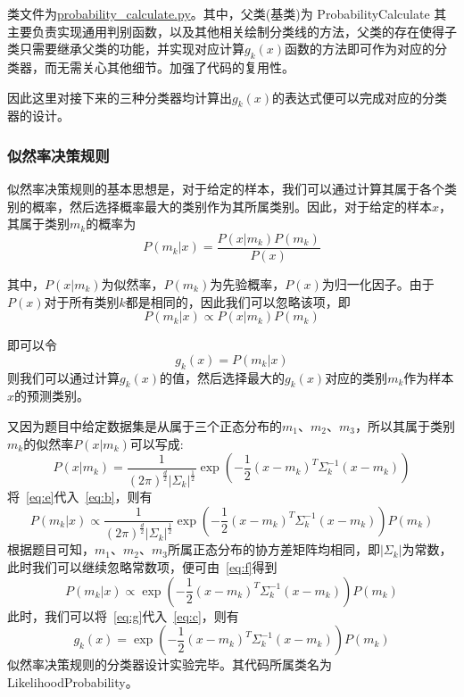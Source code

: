 \documentclass[UTF8]{article} %
\begin{document}
    类文件为\href{run:probability_calculate.py}{probability\_calculate.py}。其中，父类(基类)为 ProbabilityCalculate 其主要负责实现通用判别函数，以及其他相关绘制分类线的方法，父类的存在使得子类只需要继承父类的功能，并实现对应计算$g_k(x)$函数的方法即可作为对应的分类器，而无需关心其他细节。加强了代码的复用性。

    因此这里对接下来的三种分类器均计算出$g_k(x)$的表达式便可以完成对应的分类器的设计。

    \subsubsection{似然率决策规则}\label{subsubsec:likelihood}
    似然率决策规则的基本思想是，对于给定的样本，我们可以通过计算其属于各个类别的概率，然后选择概率最大的类别作为其所属类别。因此，对于给定的样本$x$，其属于类别$m_k$的概率为
    \begin{equation}
        P(m_k|x) = \frac{P(x|m_k)P(m_k)}{P(x)} \label{eq:a}
    \end{equation}

    其中，$P(x|m_k)$为似然率，$P(m_k)$为先验概率，$P(x)$为归一化因子。由于$P(x)$对于所有类别$k$都是相同的，因此我们可以忽略该项，即
    \begin{equation}
        P(m_k|x) \propto P(x|m_k)P(m_k) \label{eq:b}
    \end{equation}

    即可以令
    \begin{equation}
        g_k(x) = P(m_k|x) \label{eq:c}
    \end{equation}
    则我们可以通过计算$g_k(x)$的值，然后选择最大的$g_k(x)$对应的类别$m_k$作为样本$x$的预测类别。

    又因为题目中给定数据集是从属于三个正态分布的$m_1$、$m_2$、$m_3$，所以其属于类别$m_k$的似然率$P(x|m_k)$可以写成:
    \begin{equation}
        P(x|m_k) = \frac{1}{(2\pi)^{\frac{d}{2}}|\Sigma_k|^{\frac{1}{2}}}\exp\left(-\frac{1}{2}(x-m_k)^T\Sigma_k^{-1}(x-m_k)\right) \label{eq:e}
    \end{equation}
    将~\eqref {eq:e}代入~\eqref {eq:b}，则有
    \begin{equation}
        P(m_k|x) \propto \frac{1}{(2\pi)^{\frac{d}{2}}|\Sigma_k|^{\frac{1}{2}}}\exp\left(-\frac{1}{2}(x-m_k)^T\Sigma_k^{-1}(x-m_k)\right)P(m_k) \label{eq:f}
    \end{equation}
    根据题目可知，$m_1$、$m_2$、$m_3$所属正态分布的协方差矩阵均相同，即$|\Sigma_k|$为常数，此时我们可以继续忽略常数项，便可由~\eqref {eq:f}得到
    \begin{equation}
        P(m_k|x) \propto \exp\left(-\frac{1}{2}(x-m_k)^T\Sigma_k^{-1}(x-m_k)\right)P(m_k) \label{eq:g}
    \end{equation}
    此时，我们可以将~\eqref {eq:g}代入~\eqref {eq:c}，则有
    \begin{equation}
        g_k(x) = \exp\left(-\frac{1}{2}(x-m_k)^T\Sigma_k^{-1}(x-m_k)\right)P(m_k) \label{eq:h}
    \end{equation}
    似然率决策规则的分类器设计实验完毕。其代码所属类名为 LikelihoodProbability。
\end{document}
